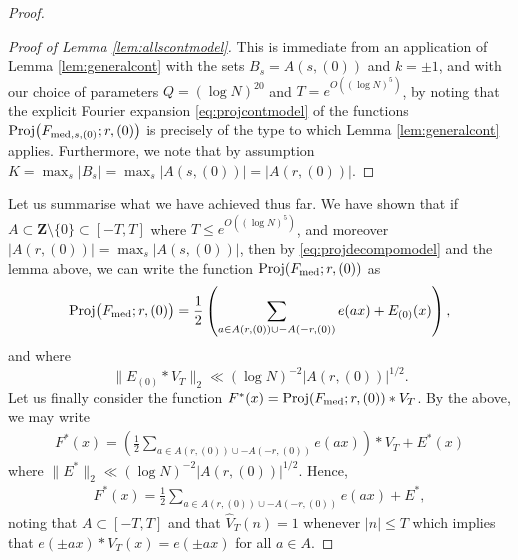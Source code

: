 \documentclass[11pt, reqno]{amsart}
\DeclareMathOperator{\Proj}{Proj}
\begin{document}
\begin{proof}
\begin{proof}[Proof of Lemma \ref{lem:allscontmodel}]
This is immediate from an application of Lemma \ref{lem:generalcont} with the sets $B_s=A(s,(0))$ and $k=\pm 1$, and with our choice of parameters $Q=(\log N)^{20}$ and $T=e^{O((\log N)^5)}$, by noting that the explicit Fourier expansion \eqref{eq:projcontmodel} of the functions $\Proj\bigl(F_{\textnormal{med},s,(0)};r,(0)\bigr)$ is precisely of the type to which Lemma \ref{lem:generalcont} applies. Furthermore, we note that by assumption $K=\max_s|B_s|=\max_s|A(s,(0))|= |A(r,(0))|$.
\end{proof}
Let us summarise what we have achieved thus far. We have shown that if $A\subset \mathbf{Z}\setminus\{0\}\subset [-T,T]$ where $T\leqslant e^{O((\log N)^5)}$, and moreover $|A(r,(0))|= \max_s|A(s,(0))|$, then by \eqref{eq:projdecompomodel} and the lemma above, we can write the function $\Proj(F_\textnormal{med};r,(0))$ as
\begin{align*}
    \Proj\bigl(F_{\textnormal{med}};r,(0)\bigr)
    =\frac{1}{2}\left(\sum_{a\in A(r,(0))\cup -A(-r,(0))}e(ax) + E_{(0)}(x)\right),\nonumber
\end{align*}
and where
\begin{equation*}\label{eq:L^2bound}
\lVert E_{(0)}*V_{T}\rVert_2\ll (\log N)^{-2}|A(r,(0))|^{1/2}.
\end{equation*}
Let us finally consider the function $F^*(x)=\Proj(F_\textnormal{med};r,(0))*V_{T}$. By the above, we may write
\begin{align*}
    F^*(x)=\left(\frac{1}{2}\sum_{a\in A(r,(0))\cup-A(-r,(0))}e(ax)\right)*V_{T}+E^*(x)
\end{align*}
where $\lVert E^*\rVert_2\ll (\log N)^{-2}|A(r,(0))|^{1/2}$. Hence,
\begin{align*}
    F^*(x) = \frac{1}{2}\sum_{a\in A(r,(0))\cup-A(-r,(0))}e(ax)+E^*,
\end{align*}
noting that $A\subset [-T,T]$ and that $\hat{V}_T(n)=1$ whenever $|n|\leqslant T$ which implies that $e(\pm ax)*V_T(x)=e(\pm ax)$ for all $a\in A$.

\medskip


\end{proof}
\end{document}
